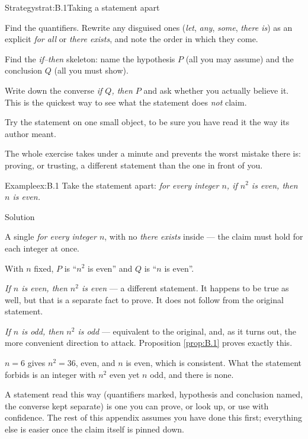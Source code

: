 \documentclass[a4paper,12pt,oneside]{memoir}
\begin{document}
\begin{envstrategy}{Strategy}{strat:B.1}{Taking a statement apart}
\begin{steps}
  \item Find the quantifiers. Rewrite any disguised ones (\emph{let}, \emph{any}, \emph{some}, \emph{there is}) as an explicit \emph{for all} or \emph{there exists}, and note the order in which they come.
  \item Find the \emph{if–then} skeleton: name the hypothesis \(P\) (all you may assume) and the conclusion \(Q\) (all you must show).
  \item Write down the converse \emph{if \(Q\), then \(P\)} and ask whether you actually believe it. This is the quickest way to see what the statement does \emph{not} claim.
  \item Try the statement on one small object, to be sure you have read it the way its author meant.
\end{steps}
\begin{informal}
The whole exercise takes under a minute and prevents the worst mistake there is: proving, or trusting, a different statement than the one in front of you.
\end{informal}
\end{envstrategy}
\begin{workedexample}
\begin{envexample}{Example}{ex:B.1}{}
Take the statement apart: \emph{for every integer \(n\), if \(n^{2}\) is even, then \(n\) is even.}
\end{envexample}
\begin{envsolution}{Solution}{}{}
\begin{sollist}
  \item {} A single \emph{for every integer \(n\)}, with no \emph{there exists} inside — the claim must hold for each integer at once.
  \item {} With \(n\) fixed, \(P\) is “\(n^{2}\) is even” and \(Q\) is “\(n\) is even”.
  \item {} \emph{If \(n\) is even, then \(n^{2}\) is even} — a different statement. It happens to be true as well, but that is a separate fact to prove. It does not follow from the original statement.
  \item {} \emph{If \(n\) is odd, then \(n^{2}\) is odd} — equivalent to the original, and, as it turns out, the more convenient direction to attack. Proposition \ref{prop:B.1} proves exactly this.
  \item {} \(n = 6\) gives \(n^{2} = 36\), even, and \(n\) is even, which is consistent. What the statement forbids is an integer with \(n^{2}\) even yet \(n\) odd, and there is none.
\end{sollist}
\end{envsolution}
\end{workedexample}
A statement read this way (quantifiers marked, hypothesis and conclusion named, the converse kept separate) is one you can prove, or look up, or use with confidence. The rest of this appendix assumes you have done this first; everything else is easier once the claim itself is pinned down.
\end{document}
